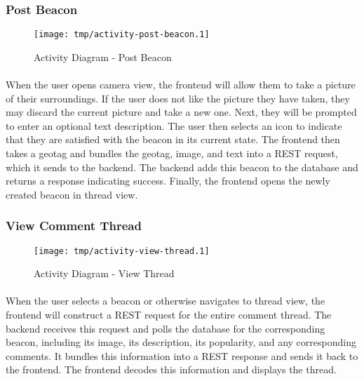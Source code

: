         \subsubsection{Post Beacon}
        \begin{figure}[H]
            \centering
            \texttt{[image: tmp/activity-post-beacon.1]} 
            \caption{Activity Diagram - Post Beacon}
        \end{figure}

        \paragraph*{}
        When the user opens camera view, the frontend will allow them to take a picture
        of their surroundings. If the user does not like the picture they have taken,
        they may discard the current picture and take a new one. Next, they will be
        prompted to enter an optional text description. The user then selects an icon
        to indicate that they are satisfied with the beacon in its current state. The
        frontend then takes a geotag and bundles the geotag, image, and text into a
        REST request, which it sends to the backend. The backend adds this beacon to
        the database and returns a response indicating success. Finally, the frontend
        opens the newly created beacon in thread view.

        \subsubsection{View Comment Thread}
        \begin{figure}[H]
            \centering
            \texttt{[image: tmp/activity-view-thread.1]} 
            \caption{Activity Diagram - View Thread}
        \end{figure}

        \paragraph*{}
        When the user selects a beacon or otherwise navigates to thread view, the
        frontend will construct a REST request for the entire comment thread. The
        backend receives this request and polls the database for the corresponding
        beacon, including its image, its description, its popularity, and any 
        corresponding comments. It bundles this information into a REST response
        and sends it back to the frontend. The frontend decodes this information
        and displays the thread.

